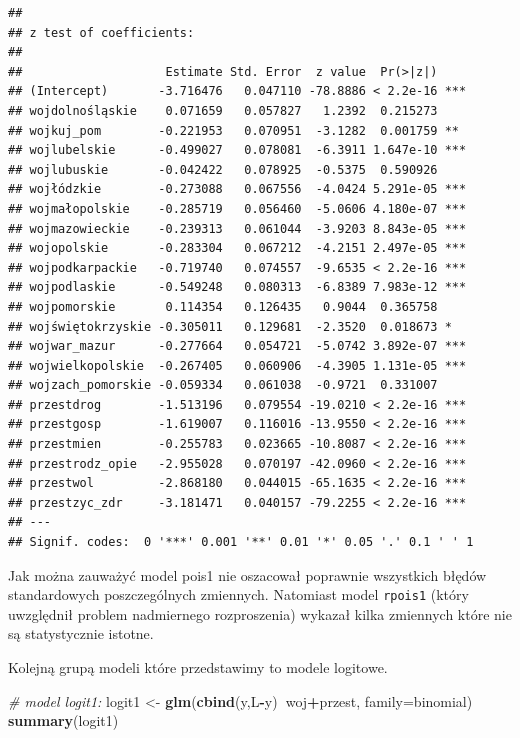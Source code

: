 \documentclass[polish,]{book}
\newenvironment{Shaded}{\begin{snugshade}}{\end{snugshade}}
\newcommand{\CommentTok}[1]{\textcolor[rgb]{0.56,0.35,0.01}{\textit{#1}}}
\newcommand{\DataTypeTok}[1]{\textcolor[rgb]{0.13,0.29,0.53}{#1}}
\newcommand{\KeywordTok}[1]{\textcolor[rgb]{0.13,0.29,0.53}{\textbf{#1}}}
\newcommand{\NormalTok}[1]{#1}
\newcommand{\OperatorTok}[1]{\textcolor[rgb]{0.81,0.36,0.00}{\textbf{#1}}}
\newcommand{\StringTok}[1]{\textcolor[rgb]{0.31,0.60,0.02}{#1}}
\begin{document}
\begin{verbatim}
## 
## z test of coefficients:
## 
##                    Estimate Std. Error  z value  Pr(>|z|)    
## (Intercept)       -3.716476   0.047110 -78.8886 < 2.2e-16 ***
## wojdolnośląskie    0.071659   0.057827   1.2392  0.215273    
## wojkuj_pom        -0.221953   0.070951  -3.1282  0.001759 ** 
## wojlubelskie      -0.499027   0.078081  -6.3911 1.647e-10 ***
## wojlubuskie       -0.042422   0.078925  -0.5375  0.590926    
## wojłódzkie        -0.273088   0.067556  -4.0424 5.291e-05 ***
## wojmałopolskie    -0.285719   0.056460  -5.0606 4.180e-07 ***
## wojmazowieckie    -0.239313   0.061044  -3.9203 8.843e-05 ***
## wojopolskie       -0.283304   0.067212  -4.2151 2.497e-05 ***
## wojpodkarpackie   -0.719740   0.074557  -9.6535 < 2.2e-16 ***
## wojpodlaskie      -0.549248   0.080313  -6.8389 7.983e-12 ***
## wojpomorskie       0.114354   0.126435   0.9044  0.365758    
## wojświętokrzyskie -0.305011   0.129681  -2.3520  0.018673 *  
## wojwar_mazur      -0.277664   0.054721  -5.0742 3.892e-07 ***
## wojwielkopolskie  -0.267405   0.060906  -4.3905 1.131e-05 ***
## wojzach_pomorskie -0.059334   0.061038  -0.9721  0.331007    
## przestdrog        -1.513196   0.079554 -19.0210 < 2.2e-16 ***
## przestgosp        -1.619007   0.116016 -13.9550 < 2.2e-16 ***
## przestmien        -0.255783   0.023665 -10.8087 < 2.2e-16 ***
## przestrodz_opie   -2.955028   0.070197 -42.0960 < 2.2e-16 ***
## przestwol         -2.868180   0.044015 -65.1635 < 2.2e-16 ***
## przestzyc_zdr     -3.181471   0.040157 -79.2255 < 2.2e-16 ***
## ---
## Signif. codes:  0 '***' 0.001 '**' 0.01 '*' 0.05 '.' 0.1 ' ' 1
\end{verbatim}

Jak można zauważyć model pois1 nie oszacował poprawnie wszystkich błędów standardowych poszczególnych zmiennych. Natomiast model \texttt{rpois1} (który uwzględnił
problem nadmiernego rozproszenia) wykazał kilka zmiennych które nie są statystycznie istotne.

Kolejną grupą modeli które przedstawimy to modele logitowe.

\begin{Shaded}
\begin{Highlighting}[]
\CommentTok{# model logit1:}
\NormalTok{logit1 <-}\StringTok{ }\KeywordTok{glm}\NormalTok{(}\KeywordTok{cbind}\NormalTok{(y,L}\OperatorTok{-}\NormalTok{y)}\OperatorTok{~}\NormalTok{woj}\OperatorTok{+}\NormalTok{przest, }\DataTypeTok{family=}\NormalTok{binomial)}
\KeywordTok{summary}\NormalTok{(logit1)}
\end{Highlighting}
\end{Shaded}
\end{document}
